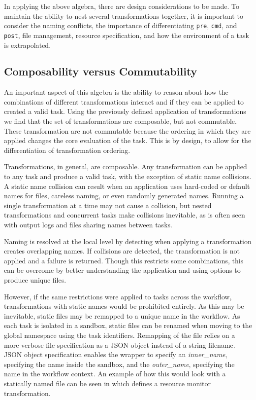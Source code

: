 \documentclass[conference]{IEEEtran}
\begin{document}
In applying the above algebra, there are
design considerations to be made.
To maintain the ability to nest several
transformations together, it is important
to consider the naming conflicts, the
importance of differentiating {\tt pre},
{\tt cmd}, and {\tt post}, file management,
resource specification, and how the 
environment of a task is extrapolated.

\subsection{ Composability versus Commutability }
An important aspect of this algebra is the ability
to reason about how the combinations of
different transformations interact and if they 
can be applied to created a valid task.
Using the previously defined application of
transformations we find that the set of transformations
are composable, but not commutable.
These transformation are not commutable because
the ordering in which they are applied changes the core 
evaluation of the task.
This is by design, to allow for the differentiation
of transformation ordering.

Transformations, in general, are composable.
Any transformation can be
applied to any task and produce a valid task,
with the exception of static name collisions.
A static name collision can result when
an application uses hard-coded or 
default names for files, 
careless naming, or even randomly
generated names.
Running a single transformation at a time 
may not cause a collision,
but nested transformations and concurrent tasks 
make collisions inevitable, 
as is often seen with output logs
and files sharing names between tasks.

Naming is resolved at the local level by detecting
when applying a transformation 
creates overlapping names.
If collisions are detected, the 
transformation is not applied and
a failure is returned.
Though this restricts some combinations, 
this can be overcome by 
better understanding the application
and using options to 
produce unique files.


However, if the same restrictions were
applied to tasks across the workflow,
transformations with static names would
be prohibited entirely.
As this may be inevitable,
static files may be remapped
to a unique name in the workflow.
As each task is isolated in a sandbox, 
static files can be renamed when moving to the 
global namespace using the task identifiers. 
Remapping of the file relies on
a more verbose file specification as
a JSON object instead of a string filename.
JSON object specification enables the wrapper
to specify an \emph{inner\_name}, 
specifying the name inside the sandbox,
and the \emph{outer\_name},
specifying the name in the workflow context. 
An example of how this would look with
a statically named file can be seen in 
 which defines a resource
monitor transformation.
\end{document}
